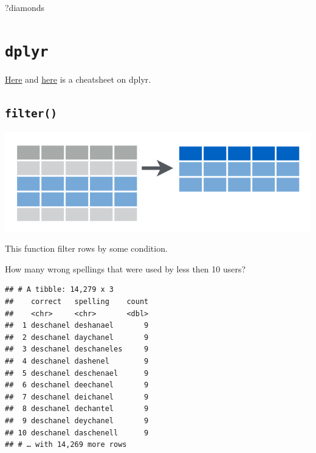 \documentclass[
]{book}
\newenvironment{Shaded}{\begin{snugshade}}{\end{snugshade}}
\newcommand{\DecValTok}[1]{\textcolor[rgb]{0.00,0.00,0.81}{#1}}
\newcommand{\KeywordTok}[1]{\textcolor[rgb]{0.13,0.29,0.53}{\textbf{#1}}}
\newcommand{\NormalTok}[1]{#1}
\newcommand{\OperatorTok}[1]{\textcolor[rgb]{0.81,0.36,0.00}{\textbf{#1}}}
\newcommand{\StringTok}[1]{\textcolor[rgb]{0.31,0.60,0.02}{#1}}
\begin{document}
\begin{Shaded}
\begin{Highlighting}[]
\NormalTok{?diamonds}
\end{Highlighting}
\end{Shaded}

\hypertarget{dplyr-1}{%
\section{\texorpdfstring{\texttt{dplyr}}{dplyr}}\label{dplyr-1}}

\href{https://www.rstudio.com/wp-content/uploads/2015/02/data-wrangling-cheatsheet.pdf}{Here} and \href{https://github.com/rstudio/cheatsheets/raw/master/data-transformation.pdf}{here} is a cheatsheet on dplyr.

\hypertarget{filter}{%
\subsection{\texorpdfstring{\texttt{filter()}}{filter()}}\label{filter}}

\includegraphics{images/02.01.filter.png}

This function filter rows by some condition.

How many wrong spellings that were used by less then 10 users?

\begin{Shaded}
\end{Shaded}

\begin{verbatim}
## # A tibble: 14,279 x 3
##    correct   spelling    count
##    <chr>     <chr>       <dbl>
##  1 deschanel deshanael       9
##  2 deschanel daychanel       9
##  3 deschanel deschaneles     9
##  4 deschanel dashenel        9
##  5 deschanel deschenael      9
##  6 deschanel deechanel       9
##  7 deschanel deichanel       9
##  8 deschanel dechantel       9
##  9 deschanel deychanel       9
## 10 deschanel daschenell      9
## # … with 14,269 more rows
\end{verbatim}
\end{document}
